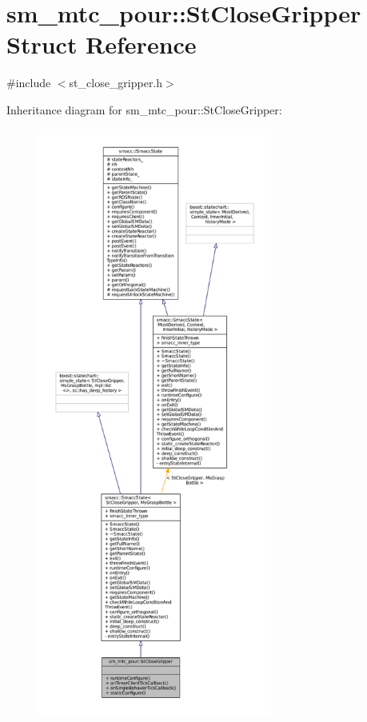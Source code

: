\hypertarget{structsm__mtc__pour_1_1StCloseGripper}{}\section{sm\+\_\+mtc\+\_\+pour\+:\+:St\+Close\+Gripper Struct Reference}
\label{structsm__mtc__pour_1_1StCloseGripper}


{\ttfamily \#include $<$st\+\_\+close\+\_\+gripper.\+h$>$}



Inheritance diagram for sm\+\_\+mtc\+\_\+pour\+:\+:St\+Close\+Gripper\+:
\nopagebreak
\begin{figure}[H]
\begin{center}
\leavevmode
\includegraphics[height=550pt]{structsm__mtc__pour_1_1StCloseGripper__inherit__graph}
\end{center}
\end{figure}


